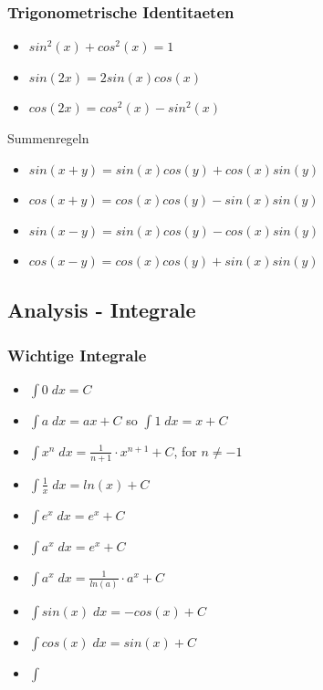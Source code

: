 \documentclass[a4paper]{article}
\begin{document}
\subsubsection*{Trigonometrische Identitaeten}

\begin{itemize}
	\item $sin^2(x) + cos^2(x) = 1$
	\item $sin(2x) = 2 sin(x)cos(x)$
	\item $cos(2x) = cos^2(x) - sin^2(x)$
\end{itemize}

Summenregeln

\begin{itemize}
	\item $sin(x + y) = sin(x)cos(y) + cos(x)sin(y)$
	\item $cos(x + y) = cos(x)cos(y) - sin(x)sin(y)$
	\item $sin(x - y) = sin(x)cos(y) - cos(x)sin(y)$
	\item $cos(x - y) = cos(x)cos(y) + sin(x)sin(y)$
\end{itemize}



\subsection*{Analysis - Integrale}



\subsubsection*{Wichtige Integrale}

\begin{itemize}
	\item $\int 0 \; dx = C$
	\item $\int a \; dx = ax + C$ so $\int 1 \; dx = x + C$
	\item $\int x^n \; dx = \frac{1}{n + 1} \cdot x^{n + 1} + C$, for $n \neq -1$
	\item $\int \frac{1}{x} \; dx = ln(x) + C$
	\item $\int e^x \; dx = e^x + C$
	\item $\int a^x \; dx = e^x + C$
	\item $\int a^x \; dx = \frac{1}{ln(a)} \cdot a^x + C$
	\item $\int sin(x) \; dx = - cos(x) + C$
	\item $\int cos(x) \; dx = sin(x) + C$
	\item $\int $
\end{itemize}
\end{document}
